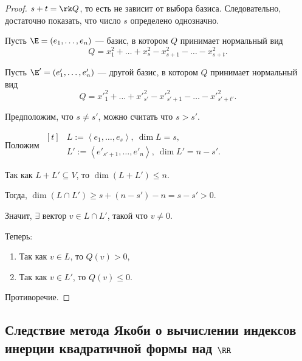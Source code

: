 \begin{proof}
    $s + t = \rk Q$, то есть не зависит от выбора базиса. Следовательно, достаточно показать, что число $s$ определено однозначно.

    Пусть $\E = (e_1, \dots, e_n)$ --- базис, в котором $Q$ принимает нормальный вид
    \begin{equation*}
        Q = x_1^2 + \dots + x_s ^2 - x_{s + 1}^2 - \dots - x_{s + t}^2
    .\end{equation*}

    Пусть $\E' = (e'_1, \dots, e'_n)$ --- другой базис, в котором $Q$ принимает нормальный вид
    \begin{equation*}
        Q = x'^2_1 + \dots + x'^2_{s'} - x'^2_{s' + 1} - \dots - x'^2_{s' + t'}
    .\end{equation*}

    Предположим, что $s \neq s'$, можно считать что $s > s'$.

    Положим 
    \begin{math}
        \begin{aligned}[t]
            &L := \left< e_1, \dots, e_s \right>, \ \dim L = s, \\
            &L' := \left< e'_{s' + 1}, \dots, e'_n \right>, \ \dim L' = n - s'.
        \end{aligned}
    \end{math}

    \bigskip
    Так как $L + L' \subseteq V$, то $\dim \left(L + L'\right) \leq n$.

    Тогда, $\dim \left(L \cap L'\right) \geq s + (n - s') - n = s - s' > 0$.

    \bigskip
    Значит, $\exists$ вектор $v \in L \cap L'$, такой что $v \neq 0$.

    Теперь: 
    \begin{enumerate}[nosep]
        \item Так как $v \in L$, то $Q(v) > 0$,
        \item Так как $v \in L'$, то $Q(v) \leq 0$.
    \end{enumerate}
 
    Противоречие.
\end{proof}


\subsection{Следствие метода Якоби о вычислении индексов инерции квадратичной формы над $\RR$}


